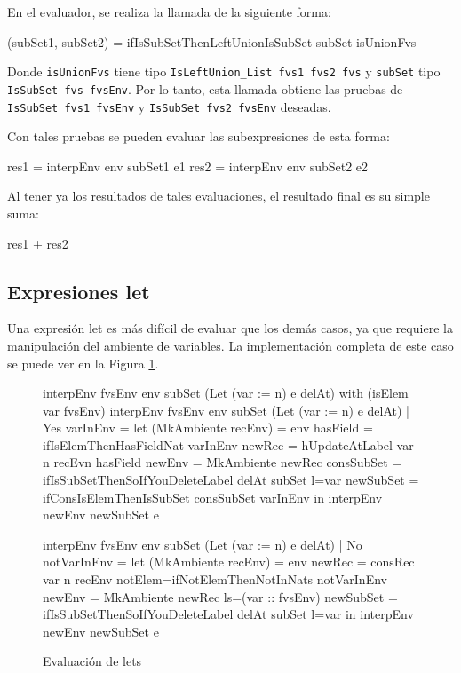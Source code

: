 En el evaluador, se realiza la llamada de la siguiente forma:

\begin{code}
(subSet1, subSet2) =
  ifIsSubSetThenLeftUnionIsSubSet subSet isUnionFvs
\end{code}

Donde \texttt{isUnionFvs} tiene tipo \texttt{IsLeftUnion\_List fvs1 fvs2 fvs} y \texttt{subSet} tipo \texttt{IsSubSet fvs fvsEnv}. Por lo tanto, esta llamada obtiene las pruebas de \texttt{IsSubSet fvs1 fvsEnv} y \texttt{IsSubSet fvs2 fvsEnv} deseadas.

Con tales pruebas se pueden evaluar las subexpresiones de esta forma:

\begin{code}
res1 = interpEnv env subSet1 e1
res2 = interpEnv env subSet2 e2
\end{code}

Al tener ya los resultados de tales evaluaciones, el resultado final es su simple suma:

\begin{code}
res1 + res2
\end{code}

\subsection{Expresiones let}

Una expresión let es más difícil de evaluar que los demás casos, ya que requiere la manipulación del ambiente de variables. La implementación completa de este caso se puede ver en la Figura \ref{fig:InterpImplLet}.

\begin{figure}[h]

\begin{code}
interpEnv {fvsEnv} env subSet (Let (var := n) e delAt)
    with (isElem var fvsEnv)
  interpEnv {fvsEnv} env subSet (Let (var := n) e delAt)
    | Yes varInEnv =
    let (MkAmbiente recEnv) = env
      hasField = ifIsElemThenHasFieldNat varInEnv 
      newRec = hUpdateAtLabel var n recEvn hasField
      newEnv = MkAmbiente newRec
      consSubSet =
        ifIsSubSetThenSoIfYouDeleteLabel delAt subSet {l=var}
      newSubSet = ifConsIsElemThenIsSubSet consSubSet varInEnv
    in interpEnv newEnv newSubSet e
 
  interpEnv {fvsEnv} env subSet (Let (var := n) e delAt)
    | No notVarInEnv =
    let (MkAmbiente recEnv) = env
      newRec = consRec var n recEnv
        {notElem=ifNotElemThenNotInNats notVarInEnv}
      newEnv = MkAmbiente newRec {ls=(var :: fvsEnv)}
      newSubSet =
        ifIsSubSetThenSoIfYouDeleteLabel delAt subSet {l=var}
    in interpEnv newEnv newSubSet e
\end{code}

\caption{Evaluación de lets}
\label{fig:InterpImplLet}
\end{figure}

